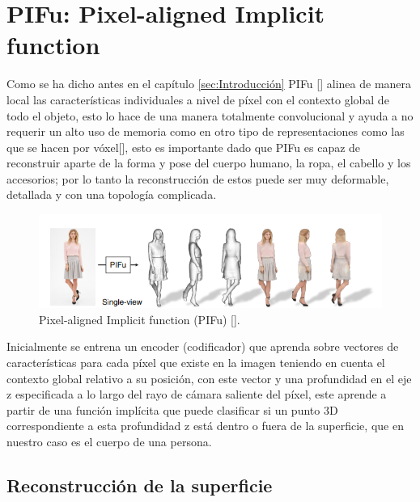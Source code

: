 \section{PIFu: Pixel-aligned Implicit function}
Como se ha dicho antes en el capítulo \ref{sec:Introducción} PIFu [\cite{pifu}] alinea de manera local las características individuales a nivel de píxel con el contexto global de todo el objeto, esto lo hace de una manera totalmente convolucional y ayuda a no requerir un alto uso de memoria como en otro tipo de representaciones como las que se hacen por vóxel[\cite{bodynet}], esto es importante dado que PIFu es capaz de reconstruir aparte de la forma y pose del cuerpo humano, la ropa, el cabello y los accesorios; por lo tanto la reconstrucción de estos puede ser muy deformable, detallada y con una topología complicada.

\begin{figure}[!h]
	\centering
	\includegraphics[scale=0.7]{imagenes/antecedentes1.png}
	\caption{Pixel-aligned Implicit function (PIFu) [\cite{pifu}].}
	\label{fig:figura7}
\end{figure}
\pagebreak

Inicialmente se entrena un encoder (codificador) que aprenda sobre vectores de características para cada píxel que existe en la imagen teniendo en cuenta el contexto global relativo a su posición, con este vector y una profundidad en el eje z especificada a lo largo del rayo de cámara saliente del píxel, este aprende a partir de una función implícita que puede clasificar si un punto 3D correspondiente a esta profundidad z está dentro o fuera de la superficie, que en nuestro caso es el cuerpo de una persona.

\subsection{Reconstrucción de la superficie}

